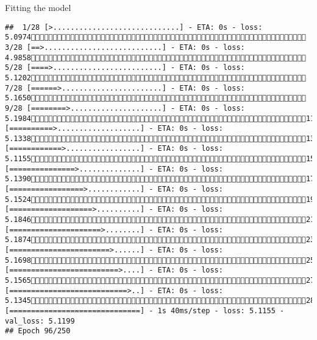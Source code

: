 \documentclass[
  ignorenonframetext,
]{beamer}
\begin{document}
\begin{frame}[fragile]{Fitting the model}
\begin{verbatim}
##  1/28 [>.............................] - ETA: 0s - loss: 5.0974 3/28 [==>...........................] - ETA: 0s - loss: 4.9858 5/28 [====>.........................] - ETA: 0s - loss: 5.1202 7/28 [======>.......................] - ETA: 0s - loss: 5.1650 9/28 [========>.....................] - ETA: 0s - loss: 5.198411/28 [==========>...................] - ETA: 0s - loss: 5.133813/28 [============>.................] - ETA: 0s - loss: 5.115515/28 [===============>..............] - ETA: 0s - loss: 5.139017/28 [=================>............] - ETA: 0s - loss: 5.152419/28 [===================>..........] - ETA: 0s - loss: 5.184621/28 [=====================>........] - ETA: 0s - loss: 5.187423/28 [=======================>......] - ETA: 0s - loss: 5.169825/28 [=========================>....] - ETA: 0s - loss: 5.156527/28 [===========================>..] - ETA: 0s - loss: 5.134528/28 [==============================] - 1s 40ms/step - loss: 5.1155 - val_loss: 5.1199
## Epoch 96/250

\end{verbatim}
\end{frame}
\end{document}

